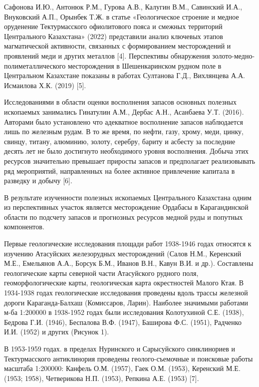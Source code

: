 Сафонова И.Ю., Антонюк Р.М., Гурова А.В., Калугин В.М., Савинский И.А.,
Внуковский А.П., Орынбек Т.Ж. в статье «Геологическое строение и медное
оруденение Тектурмасского офиолитового пояса и смежных территорий
Центрального Казахстана» (2022) представили анализ ключевых этапов
магматической активности, связанных с формированием месторождений и
проявлений меди и других металлов {[}4{]}. Перспективы обнаружения
золото-медно-полиметаллического месторождения в Шешенкаринском рудном
поле в Центральном Казахстане показаны в работах Султанова Г.Д.,
Вихлянцева А.А. Исмаилова Х.К. (2019) {[}5{]}.

Исследованиями в области оценки восполнения запасов основных полезных
ископаемых занимались Гинатулин А.М., Дербас А.Н., Асанбаева У.Т.
(2016). Авторами было установлено что адекватное восполнение запасов
наблюдается лишь по железным рудам. В то же время, по нефти, газу,
хрому, меди, цинку, свинцу, титану, алюминию, золоту, серебру, бариту и
асбесту за последние десять лет не было достигнуто необходимого уровня
восполнения. Добыча этих ресурсов значительно превышает приросты запасов
и предполагает реализовывать ряд мероприятий, направленных на более
активное привлечение капитала в разведку и добычу {[}6{]}.

В результате изученности полезных ископаемых Центрального Казахстана
одним из перспективных участок является месторождение Ордабасы в
Карагандинской области по подсчету запасов и прогнозных ресурсов медной
руды и попутных компонентов.

Первые геологические исследования площади работ 1938-1946 годах
относятся к изучению Атасуйских железорудных месторождений (Салов Н.М.,
Керенский М.Е., Емельянов А.А., Борсук Б.М., Иванов В.Н., Кавун В.И. и
др.). Составлены геологические карты северной части Атасуйского рудного
поля, геоморфологические карты, геологическая карта окрестностей Малого
Ктая. В 1934-1938 годах геологические исследования проведены вдоль
трассы железной дороги Караганда-Балхаш (Комиссаров, Ларин). Наиболее
значимыми работами м-ба 1:200000 в 1938-1952 годах были исследования
Колотухиной С.Е. (1938), Бедрова Г.И. (1946), Беспалова В.Ф. (1947),
Баширова Ф.С. (1951), Радченко И.И. (1952) и других (Рисунок 1).

В 1953-1959 годах. в пределах Нуринского и Сарысуйского синклинориев и
Тектурмасского антиклинория проведены геолого-съемочные и поисковые
работы масштаба 1:200000: Канфель О.М. (1957), Гаек О.М. (1953),
Керенский М.Е. (1953; 1958), Четверикова Н.П. (1953), Репкина А.Е.
(1953) {[}7{]}.

